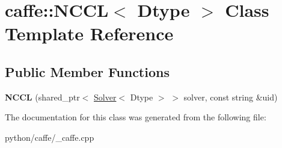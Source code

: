 \hypertarget{classcaffe_1_1_n_c_c_l}{}\section{caffe\+:\+:N\+C\+CL$<$ Dtype $>$ Class Template Reference}
\label{classcaffe_1_1_n_c_c_l}
\subsection*{Public Member Functions}
\begin{DoxyCompactItemize}
\item 
\mbox{\label{classcaffe_1_1_n_c_c_l_a46c8d7060ff473735679a901b5d6bc50}} 
{\bfseries N\+C\+CL} (shared\+\_\+ptr$<$ \mbox{\hyperlink{classcaffe_1_1_solver}{Solver}}$<$ Dtype $>$ $>$ solver, const string \&uid)
\end{DoxyCompactItemize}


The documentation for this class was generated from the following file\+:\begin{DoxyCompactItemize}
\item 
python/caffe/\+\_\+caffe.\+cpp\end{DoxyCompactItemize}
